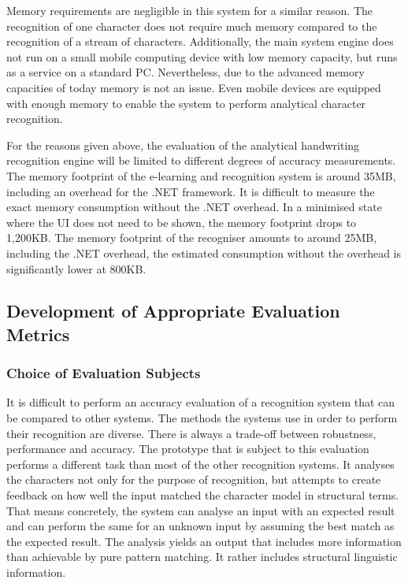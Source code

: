 Memory requirements are negligible in this system for a similar reason.
The recognition of one character does not require much memory compared to
the recognition of a stream of characters. Additionally, the main system engine
does not run on a small mobile computing device with low memory capacity,
but runs as a service on a standard PC. Nevertheless, due to the advanced 
memory capacities of today memory is not an issue. Even mobile devices are 
equipped with enough memory to enable the system to perform analytical character
recognition.

For the reasons given above, the evaluation of the analytical handwriting 
recognition engine will be limited to different degrees of accuracy measurements.
The memory footprint of the e-learning and recognition system is around 35MB,
including an overhead for the .NET framework. It is difficult to measure the
exact memory consumption without the .NET overhead. In a minimised state 
where the UI does not need to be shown, the memory footprint drops to
1,200KB. The memory footprint of the recogniser amounts to around 25MB, 
including the .NET overhead, the estimated consumption without the overhead
is significantly lower at 800KB.

\subsection{Development of Appropriate Evaluation Metrics}
\label{sec:eval:developmentofevalmetrics}

\subsubsection{Choice of Evaluation Subjects}
\label{sec:eval:evaluationsubjects}
It is difficult to perform an accuracy evaluation of a recognition system
that can be compared to other systems. The methods the systems use in order
to perform their recognition are diverse. There is always a trade-off between
robustness, performance and accuracy.
The prototype that is subject to this evaluation performs a different
task than most of the other recognition systems. It analyses the characters
not only for the purpose of recognition, but attempts to create feedback on
how well the input matched the character model in structural terms.
That means concretely, the system can analyse an input with an expected result
and can perform the same for an unknown input by assuming the best match
as the expected result. The analysis yields an output that includes more
information than achievable by pure pattern matching. 
It rather includes structural linguistic information.

